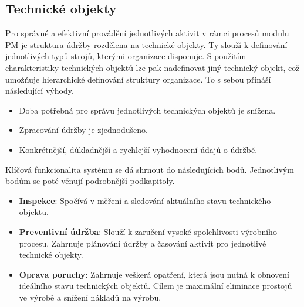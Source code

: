 \documentclass[thesis=M,czech]{FITthesis}[2012/06/26]
\begin{document}
\subsection{Technické objekty}
Pro správné a efektivní provádění jednotlivých aktivit v rámci procesů modulu PM je struktura údržby rozdělena na technické objekty. Ty slouží k definování jednotlivých typů strojů, kterými organizace disponuje. S použitím charakteristiky technických objektů lze pak nadefinovat jiný technický objekt, což umožňuje hierarchické definování struktury organizace. To s sebou přináší následující výhody.
\begin{itemize}
	\item
	Doba potřebná pro správu jednotlivých technických objektů je snížena.
	\item
	Zpracování údržby je zjednodušeno.
	\item
	Konkrétnější, důkladnější a rychlejší vyhodnocení údajů o údržbě.
\end{itemize}
Klíčová funkcionalita systému se dá shrnout do následujících bodů. Jednotlivým bodům se poté věnují podrobnější podkapitoly.
\begin{itemize}
	\item
	\textbf{Inspekce}: Spočívá v měření a sledování aktuálního stavu technického objektu.
	\item
	\textbf{Preventivní údržba}: Slouží k zaručení vysoké spolehlivosti výrobního procesu. Zahrnuje plánování údržby a časování aktivit pro jednotlivé technické objekty.
	\item
	\textbf{Oprava poruchy}: Zahrnuje veškerá opatření, která jsou nutná k obnovení ideálního stavu technických objektů. Cílem je maximální eliminace prostojů ve výrobě a snížení nákladů na výrobu.
\end{itemize}
\end{document}
